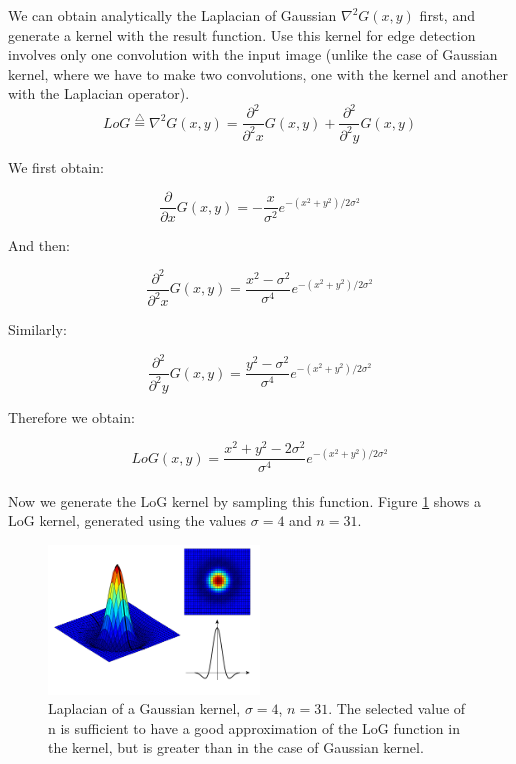 \documentclass{ipol}
\numberwithin{equation}{section}
\numberwithin{table}{section}
\numberwithin{figure}{section}
\begin{document}
We can obtain analytically the Laplacian of Gaussian $\nabla^2G(x,y)$ first, and generate a kernel 
with the result function. Use this kernel for edge detection involves only one convolution with 
the input image (unlike the case of Gaussian kernel, where we have to make two convolutions, one 
with the kernel and another with the Laplacian operator).\\

\begin{equation}
	LoG \stackrel{\triangle}{=}\nabla^2G(x,y)=\frac{\partial^2}{\partial^2 x}G(x,y) + \frac{\partial^2}{\partial^2 y}G(x,y)
\end{equation}

We first obtain:

\begin{equation} 
	\frac{\partial}{\partial x}G(x,y)=-\frac{x}{\sigma^2}e^{-(x^2+y^2)/2\sigma^2}
\end{equation}

And then:

\begin{equation} 
	\frac{\partial^2}{\partial^2 x}G(x,y)=\frac{x^2-\sigma^2}{\sigma^4}e^{-(x^2+y^2)/2\sigma^2} 
\end{equation}

Similarly:

\begin{equation} 
	\frac{\partial^2}{\partial^2 y}G(x,y)=\frac{y^2-\sigma^2}{\sigma^4}e^{-(x^2+y^2)/2\sigma^2} 
\end{equation}

Therefore we obtain:

\begin{equation}
	\label{eq:log_function}
	LoG(x,y)=\frac{x^2+y^2-2\sigma^2}{\sigma^4}e^{-(x^2+y^2)/2\sigma^2}
\end{equation}\\

Now we generate the LoG kernel by sampling this function. Figure \ref{fig:log_kernel} shows a LoG kernel, generated using the 
values $\sigma=4$ and $n=31$.\\

\begin{figure}
	\centering
	\includegraphics[width=0.5\textwidth]{kernel_log.pdf}
	\caption{Laplacian of a Gaussian kernel, $\sigma=4$, $n=31$. The selected value of n is sufficient 
to have a good approximation of the LoG function in the kernel, but is greater than in the case of 
Gaussian kernel.}
	\label{fig:log_kernel}
\end{figure}
\end{document}
